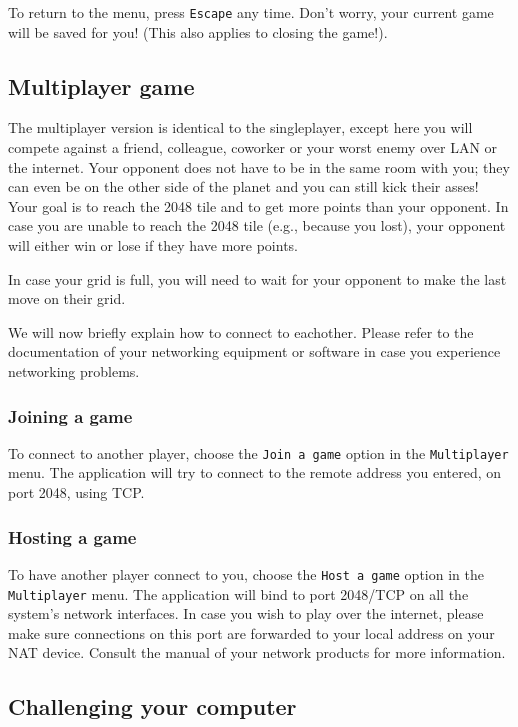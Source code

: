 \documentclass[a4paper,11pt,report]{scrartcl}
\begin{document}
To return to the menu, press \texttt{Escape} any time. Don't worry,
your current game will be saved for you! (This also applies to closing the
game!).

\subsection{Multiplayer game}
The multiplayer version is identical to the singleplayer, except here you will
compete against a friend, colleague, coworker or your worst enemy over LAN or
the internet. Your opponent does not have to be in the same room with you; they
can even be on the other side of the planet and you can still kick their
asses!\\

Your goal is to reach the 2048 tile and to get more points than your opponent.  In case you
are unable to reach the 2048 tile (e.g., because you lost), your opponent will either win or lose if they have more points. 

In case your grid is full, you will need to wait for your opponent to make the last move on their grid.

We will now briefly explain how to connect to eachother. Please refer to the
documentation of your networking equipment or software in case you experience
networking problems.

\subsubsection{Joining a game}
To connect to another player, choose the \texttt{Join a game} option in the
\texttt{Multiplayer} menu. The application will try to connect to the remote address you
entered, on port 2048, using TCP.

\subsubsection{Hosting a game}
To have another player connect to you, choose the \texttt{Host a game} option
in the \texttt{Multiplayer} menu. The application will bind to port 2048/TCP on all the
system's network interfaces. In case you wish to play over the internet,
please make sure connections on this port are forwarded to your local address
on your NAT device. Consult the manual of your network products for more 
information.


\subsection{Challenging your computer}
\end{document}
